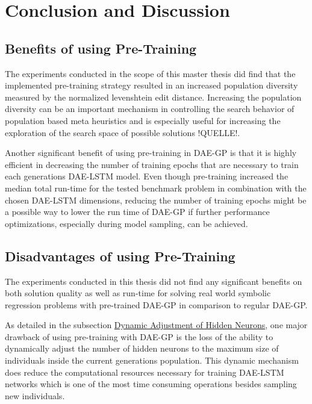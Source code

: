 \documentclass[
  11pt,
]{article}
\begin{document}
\hypertarget{conclusion-and-discussion}{%
\section{Conclusion and Discussion}\label{conclusion-and-discussion}}

\hypertarget{benefits-of-using-pre-training}{%
\subsection{Benefits of using Pre-Training}\label{benefits-of-using-pre-training}}

The experiments conducted in the scope of this master thesis did find that the implemented pre-training strategy resulted in an increased population diversity measured by the normalized levenshtein edit distance. Increasing the population diversity can be an important mechanism in controlling the search behavior of population based meta heuristics and is especially useful for increasing the exploration of the search space of possible solutions !QUELLE!.

Another significant benefit of using pre-training in DAE-GP is that it is highly efficient in decreasing the number of training epochs that are necessary to train each generations DAE-LSTM model. Even though pre-training increased the median total run-time for the tested benchmark problem in combination with the chosen DAE-LSTM dimensions, reducing the number of training epochs might be a possible way to lower the run time of DAE-GP if further performance optimizations, especially during model sampling, can be achieved.

\hypertarget{disadvantages-of-using-pre-training}{%
\subsection{Disadvantages of using Pre-Training}\label{disadvantages-of-using-pre-training}}

The experiments conducted in this thesis did not find any significant benefits on both solution quality as well as run-time for solving real world symbolic regression problems with pre-trained DAE-GP in comparison to regular DAE-GP.

As detailed in the subsection \protect\hyperlink{dynamic-adjustment-of-hidden-neurons}{Dynamic Adjustment of Hidden Neurons}, one major drawback of using pre-training with DAE-GP is the loss of the ability to dynamically adjust the number of hidden neurons to the maximum size of individuals inside the current generations population. This dynamic mechanism does reduce the computational resources necessary for training DAE-LSTM networks which is one of the most time consuming operations besides sampling new individuals.
\end{document}
